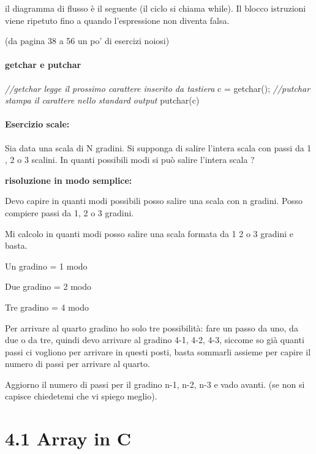 \documentclass[
  paper=a4,
  oneside  ,captions=tableheading
]{scrbook}
\newenvironment{Shaded}{}{}
\newcommand{\CommentTok}[1]{\textcolor[rgb]{0.38,0.63,0.69}{\textit{#1}}}
\newcommand{\NormalTok}[1]{#1}
\begin{document}
il diagramma di flusso è il seguente (il ciclo si chiama while). Il
blocco istruzioni viene ripetuto fino a quando l'espressione non diventa
falsa.

(da pagina 38 a 56 un po' di esercizi noiosi)

\hypertarget{getchar-e-putchar}{%
\paragraph{getchar e putchar}\label{getchar-e-putchar}}

\begin{Shaded}
\begin{Highlighting}[]
\CommentTok{//getchar legge il prossimo carattere inserito da tastiera}
\NormalTok{c = getchar();}
\CommentTok{//putchar stampa il carattere nello standard output}
\NormalTok{putchar(c)}
\end{Highlighting}
\end{Shaded}

\hypertarget{esercizio-scale}{%
\paragraph{\texorpdfstring{\textbf{Esercizio
scale:}}{Esercizio scale:}}\label{esercizio-scale}}

Sia data una scala di N gradini. Si supponga di salire l'intera scala
con passi da 1 , 2 o 3 scalini. In quanti possibili modi si può salire
l'intera scala ?

\textbf{risoluzione in modo semplice:}

Devo capire in quanti modi possibili posso salire una scala con n
gradini. Posso compiere passi da 1, 2 o 3 gradini.

Mi calcolo in quanti modi posso salire una scala formata da 1 2 o 3
gradini e basta.

Un gradino = 1 modo

Due gradino = 2 modo

Tre gradino = 4 modo

Per arrivare al quarto gradino ho solo tre possibilità: fare un passo da
uno, da due o da tre, quindi devo arrivare al gradino 4-1, 4-2, 4-3,
siccome so già quanti passi ci vogliono per arrivare in questi posti,
basta sommarli assieme per capire il numero di passi per arrivare al
quarto.

Aggiorno il numero di passi per il gradino n-1, n-2, n-3 e vado avanti.
(se non si capisce chiedetemi che vi spiego meglio).

\hypertarget{array-in-c}{%
\section{4.1 Array in C}\label{array-in-c}}
\end{document}
